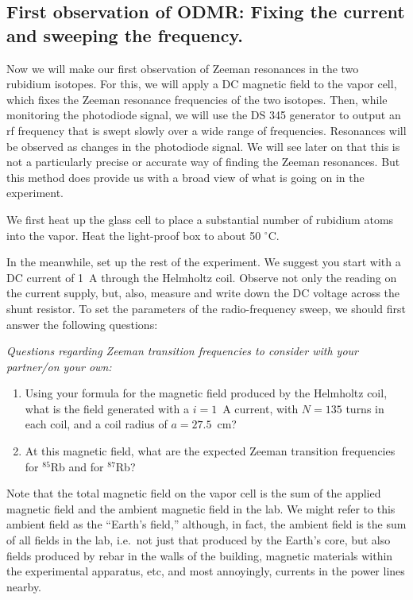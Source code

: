 \documentclass{../lab}
\begin{document}
\subsection{First observation of ODMR: Fixing the current and sweeping the frequency.}

Now we will make our first observation of Zeeman resonances in the two rubidium isotopes.  For this, we will apply a DC magnetic field to the vapor cell, which fixes the Zeeman resonance frequencies of the two isotopes.  Then, while monitoring the photodiode signal, we will use the DS 345 generator to output an rf frequency that is swept slowly over a wide range of frequencies.  Resonances will be observed as changes in the photodiode signal.  We will see later on that this is not a particularly precise or accurate way of finding the Zeeman resonances.  But this method does provide us with a broad view of what is going on in the experiment.

We first heat up the glass cell to place a substantial number of rubidium atoms into the vapor.  Heat the light-proof box to about 50 $^\circ$C.

In the meanwhile, set up the rest of the experiment.  We suggest you start with a DC current of 1~A through the Helmholtz coil.  Observe not only the reading on the current supply, but, also, measure and write down the DC voltage across the shunt resistor.  To set the parameters of the radio-frequency sweep, we should first answer the following questions:

\emph{Questions regarding Zeeman transition frequencies to consider with your partner/on your own:}
\begin{enumerate}[resume=forstudents, label=Q\arabic*.]%
\item{} Using your formula for the magnetic field produced by the Helmholtz coil, what is the field generated with a $i = 1$~A current, with $N=135$ turns in each coil, and a coil radius of $a = 27.5$~cm?
\item{} At this magnetic field, what are the expected Zeeman transition frequencies for $^{85}$Rb and for $^{87}$Rb?
\end{enumerate}

Note that the total magnetic field on the vapor cell is the sum of the applied magnetic field and the ambient magnetic field in the lab.  We might refer to this ambient field as the ``Earth's field,'' although, in fact, the ambient field is the sum of all fields in the lab, i.e.\, not just that produced by the Earth's core, but also fields produced by rebar in the walls of the building, magnetic materials within the experimental apparatus, etc, and most annoyingly, currents in the power lines nearby.
\end{document}
